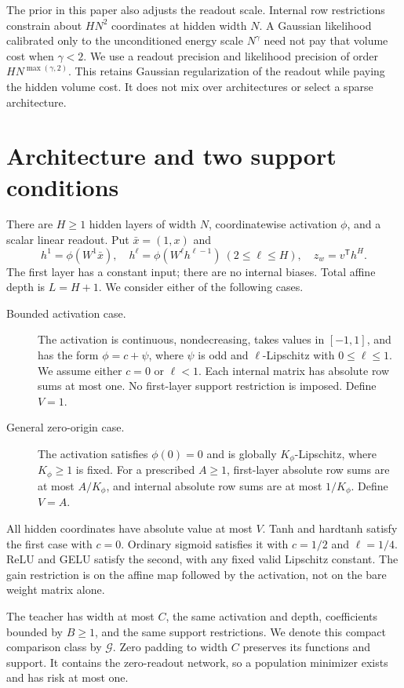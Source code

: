 \documentclass[11pt]{article}
\theoremstyle{definition}\newtheorem{definition}[theorem]{Definition}
\theoremstyle{remark}\newtheorem{remark}[theorem]{Remark}
\begin{document}
The prior in this paper also adjusts the readout scale. Internal row restrictions constrain about $HN^2$ coordinates at hidden width $N$. A Gaussian likelihood calibrated only to the unconditioned energy scale $N^\gamma$ need not pay that volume cost when $\gamma<2$. We use a readout precision and likelihood precision of order $HN^{\max(\gamma,2)}$. This retains Gaussian regularization of the readout while paying the hidden volume cost. It does not mix over architectures or select a sparse architecture.

\section{Architecture and two support conditions}
There are $H\ge1$ hidden layers of width $N$, coordinatewise activation $\phi$, and a scalar linear readout. Put $\bar x=(1,x)$ and
\[
 h^1=\phi(W^1\bar x),\quad h^\ell=\phi(W^\ell h^{\ell-1})\ (2\le\ell\le H),\quad z_w=v^{\mathsf T}h^H.
\]
The first layer has a constant input; there are no internal biases. Total affine depth is $L=H+1$. We consider either of the following cases.

\begin{description}
\item[Bounded activation case.] The activation is continuous, nondecreasing, takes values in $[-1,1]$, and has the form $\phi=c+\psi$, where $\psi$ is odd and $\ell$-Lipschitz with $0\le\ell\le1$. We assume either $c=0$ or $\ell<1$. Each internal matrix has absolute row sums at most one. No first-layer support restriction is imposed. Define $V=1$.
\item[General zero-origin case.] The activation satisfies $\phi(0)=0$ and is globally $K_\phi$-Lipschitz, where $K_\phi\ge1$ is fixed. For a prescribed $A\ge1$, first-layer absolute row sums are at most $A/K_\phi$, and internal absolute row sums are at most $1/K_\phi$. Define $V=A$.
\end{description}
All hidden coordinates have absolute value at most $V$. Tanh and hardtanh satisfy the first case with $c=0$. Ordinary sigmoid satisfies it with $c=1/2$ and $\ell=1/4$. ReLU and GELU satisfy the second, with any fixed valid Lipschitz constant. The gain restriction is on the affine map followed by the activation, not on the bare weight matrix alone.

The teacher has width at most $C$, the same activation and depth, coefficients bounded by $B\ge1$, and the same support restrictions. We denote this compact comparison class by $\mathcal G$. Zero padding to width $C$ preserves its functions and support. It contains the zero-readout network, so a population minimizer exists and has risk at most one.
\end{document}
